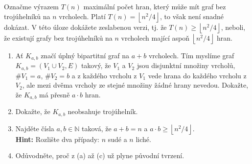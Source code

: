 \documentclass[a4paper,11pt]{article}
\newcommand{\N}{\mathbb{N}}
\begin{document}
\begin{tcolorbox}[breakable,title=\textsf{Těžké úlohy a důkazy (15
  bodů)},arc=0mm,boxsep=3mm,bottomrule=1pt,toprule=1pt,leftrule=-0.1mm,
  rightrule=-0.1mm,colframe=BrickRed!80!white,colback=BrickRed!5!white]
\begin{enumerate}
    Označme výrazem $T(n)$ maximální počet hran, který může mít graf bez
    trojúhelníků na $n$ vrcholech. Platí $T(n) = \left\lfloor n^2 / 4
    \right\rfloor$, to však není snadné dokázat. V této úloze dokážete
    zeslabenou verzi, tj. že $T(n) \geq \left\lfloor n^2 / 4 \right\rfloor$,
    neboli, že existují grafy bez trojúhelníků na $n$ vrcholech mající aspoň
    $\left\lfloor n^2 / 4 \right\rfloor$ hran.
    \begin{enumerate}
     \item Ať $K_{a,b}$ značí úplný bipartitní graf na $a+b$ vrcholech. Tím
      myslíme graf $K_{a,b} = (V_1 \cup V_2,E)$ takový, že $V_1$ a $V_2$ jsou
      disjunktní množiny vrcholů, $\# V_1 = a$, $\# V_2 = b$ a z každého vrcholu
      z $V_1$ vede hrana do každého vrcholu z $V_2$, ale mezi dvěma vrcholy ze
      stejné množiny žádné hrany nevedou. Dokažte, že $K_{a,b}$ má přesně $a
      \cdot b$ hran.
     \item Dokažte, že $K_{a,b}$ neobsahuje trojúhelník.
     \item Najděte čísla $a,b \in \N$ taková, že $a+b=n$ a $a \cdot b \geq
     \left\lfloor n^2 / 4 \right\rfloor$.\\
      \textbf{Hint:} Rozlište dva případy: $n$ sudé a $n$ liché.
     \item Odůvodněte, proč z (a) až (c) už plyne původní tvrzení.
    \end{enumerate}
  \end{enumerate}
 \end{tcolorbox}
\end{document}
